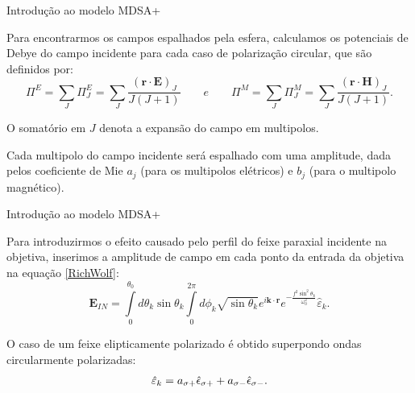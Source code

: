 \documentclass[10pt]{beamer}
\begin{document}
\begin{frame}[fragile]{Introdução ao modelo MDSA+}

    \begin{center}
        Para encontrarmos os campos espalhados pela esfera, calculamos os potenciais de Debye do campo incidente para cada caso de polarização circular, que são definidos por:
        \begin{equation}
        \Pi^{E}=\sum\limits_{J} \Pi^{E}_J=\sum\limits_{J}\frac{ ({\mathbf r}\cdot{\mathbf E })_J }{J(J+1)} \qquad e\qquad \Pi^{M}=\sum\limits_{J} \Pi^{M}_J=\sum\limits_{J}\frac{ ({\mathbf r}\cdot{\mathbf H })_J }{J(J+1)} .
        \end{equation}

        O somatório em $J$ denota a expansão do campo em multipolos. 

        Cada multipolo do campo incidente será espalhado com uma amplitude, dada pelos coeficiente de Mie $a_j$ (para os multipolos elétricos) e $b_j$ (para o multipolo magnético).

    \end{center}

\end{frame}

\begin{frame}[fragile]{Introdução ao modelo MDSA+}

    \begin{center}
    	
        Para introduzirmos o efeito causado pelo perfil do feixe paraxial incidente na objetiva, inserimos a amplitude de campo em cada ponto da entrada da objetiva na equação \ref{RichWolf}:
        \begin{equation}
        \mathbf{E}_{IN}=\int\limits_0^{\theta_0} d\theta_k \sin\theta_k \int\limits_0^{2\pi} d\phi_k\sqrt{\sin\theta_k} e^{i\mathbf{k}\cdot\mathbf{r}} e^{-\frac{f^2\sin^2\theta_k}{\omega_0^2}} \hat{\varepsilon}_k.        
        \end{equation}

        O caso de um feixe elipticamente polarizado é obtido superpondo ondas circularmente polarizadas:
        \begin{equation}
        \hat{\varepsilon}_k = a_{\sigma+}\hat{\bf{\epsilon}}_{\sigma+} + a_{\sigma-}\hat{\bf{\epsilon}}_{\sigma-} .     
        \end{equation}

    \end{center}

\end{frame}
\end{document}
